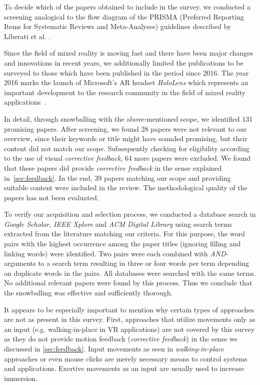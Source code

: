 To decide which of the papers obtained to include in the survey, we conducted a screening analogical to the flow diagram of the PRISMA (Preferred Reporting Items for Systematic Reviews and Meta-Analyses) guidelines described by Liberati et al. \cite{liberati2009prisma}.

Since the field of mixed reality is moving fast and there have been major changes and innovations in recent years, we additionally limited the publications to be surveyed to those which have been published in the period since 2016. The year 2016 marks the launch of Microsoft's AR headset \emph{HoloLens} which represents an important development to the research community in the field of mixed reality applications~\cite{Park2021}.

In detail, through snowballing with the above-mentioned scope, we identified 131 promising papers. After screening, we found 28 papers were not relevant to our overview, since their keywords or title might have sounded promising, but their content did not match our scope. Subsequently checking for eligibility according to the use of visual \emph{corrective feedback}, 64 more papers were excluded. We found that these papers did provide \emph{corrective feedback} in the sense explained in~\autoref{sec:feedback}. In the end, 39 papers matching our scope and providing suitable content were included in the review. The methodological quality of the papers has not been evaluated.

To verify our acquisition and selection process, we conducted a database search in \emph{Google Scholar}, \emph{IEEE Xplore} and \emph{ACM Digital Library} using search terms extracted from the literature matching our criteria. For this purpose, the word pairs with the highest occurrence among the paper titles (ignoring filling and linking words) were identified. Two pairs were each combined with \textit{AND}-arguments to a search term resulting in three or four words per term depending on duplicate words in the pairs. All databases were searched with the same terms. No additional relevant papers were found by this process. Thus we conclude that the snowballing was effective and sufficiently thorough.

It appears to be especially important to mention why certain types of approaches are not as present in this survey. First, approaches that utilize movements only as an input (e.g. walking-in-place in VR applications) are not covered by this survey as they do not provide motion feedback (\emph{corrective feedback}) in the sense we discussed in \autoref{sec:feedback}. Input movements as seen in \emph{walking-in-place} approaches or even mouse clicks are merely necessary means to control systems and applications. Exertive movements as an input are usually used to increase immersion. 

